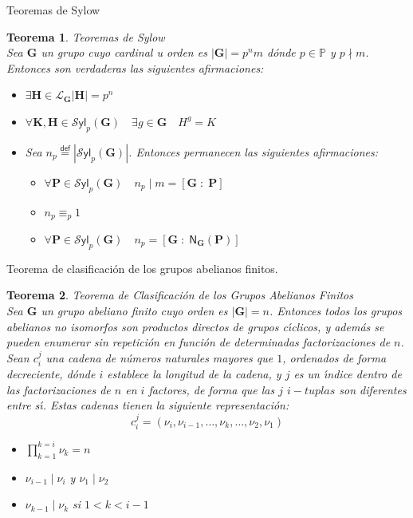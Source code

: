 \documentclass[final,12pt,a4paper,twoside,fleqn]{extbook}
\newcommand{\entreparentesis}[1]{\ensuremath{
        \left({#1}\right)
}}
\newcommand{\entrecorchetes}[1]{\ensuremath{
        \left\lbrack{#1}\right\rbrack
}}
\newcommand{\mathdef}{\ensuremath{\stackrel{\mathsf{def}}{{}={}}}}
\newcommand{\setP}{\ensuremath{}\mathbb{P}}
\newcommand{\grG}{\ensuremath{\mathbf{G}}}
\newcommand{\grH}{\ensuremath{\mathbf{H}}}
\newcommand{\grK}{\ensuremath{\mathbf{K}}}
\newcommand{\grP}{\ensuremath{\mathbf{P}}}
\newcommand{\grlattice}[1]{\ensuremath{
        {\mathcal{L}}_{#1}
}}
\newcommand{\psylowlattice}[2]{\ensuremath{
        {{\mathcal{S}\mathsf{yl}}_{#2}}
        \entreparentesis{#1}
}}
\newcommand{\normalizador}[2]{\ensuremath{
        {{\mathsf{N}}_{#1}}
        {\left({#2}\right)}
}}
\newcommand{\indice}[2]{\ensuremath{\entrecorchetes{{#1}\;:\;{#2}}}}
\newtheorem{thm}{Teorema}[chapter]
\theoremstyle{definition}
\theoremstyle{remark}
\begin{document}
Teoremas de Sylow\\
\begin{thm}{Teoremas de Sylow\\}{\label{ThSilow}}
    Sea $\grG$ un grupo cuyo cardinal u orden es $\left|{\grG}\right|=p^nm$ d\'onde $p         \in \setP$ y $p\nmid m$.
    Entonces son verdaderas las siguientes afirmaciones:
    \begin{itemize}
        \item[1] $  \exists          \grH         \in \grlattice{\grG} \left|\grH\right|=p^n$
        \item[2] $\forall \grK,\grH          \in \psylowlattice{\grG}{p} \quad          \exists          g         \in \grG\quad H^g=K$
        \item[3] Sea $n_p\mathdef{\left|\psylowlattice{\grG}{p}\right|}$. Entonces permanecen las siguientes afirmaciones:
        \begin{itemize}
            \item[3.1] $\forall \grP         \in \psylowlattice{\grG}{p}\quad n_p ∣m=\indice{\grG}{\grP}$
            \item[3.2] $n_p {         \equiv         }_{p} 1$
            \item[3.3] $\forall \grP         \in \psylowlattice{\grG}{p}\quad n_p =\indice{\grG}{\normalizador{\grG}{\grP}}$
        \end{itemize}
    \end{itemize}
\end{thm}


Teorema de clasificaci\'on de los grupos abelianos finitos.\\
\begin{thm}{Teorema de Clasificaci\'on de los Grupos Abelianos Finitos\\}{\label{ThClGAF}}
    Sea $\grG$ un grupo abeliano finito cuyo orden es $\left|\grG\right|=n$. Entonces todos los grupos abelianos no isomorfos son productos directos de grupos c{\'{\i}}clicos, y adem\'as se pueden enumerar sin repetici\'on en funci\'on de determinadas factorizaciones de $n$. Sean $c_i^j$ una cadena de n\'umeros naturales mayores que $1$, ordenados de forma decreciente, d\'onde $i$ establece la longitud de la cadena, y $j$ es un {\'{\i}}ndice dentro de las factorizaciones de $n$ en $i$ factores, de forma que las $j$ $i-tuplas$ son diferentes entre s{\'{\i}}. Estas cadenas tienen la siguiente representaci\'on:
    \[
        c_i^j = (\nu_i,\nu_{i-1},\ldots,\nu_k,\ldots,\nu_2,\nu_1)
    \]
    \begin{itemize}
        \item[1] $\prod         _{k=1}^{k=i} \nu_k=n$
        \item[2] $\nu_{i-1}∣\nu_i$ y $\nu_1∣\nu_2$
        \item[3] $\nu_{k-1}∣\nu_k$ si $1<k<i-1$
    \end{itemize}
\end{thm}
\end{document}
